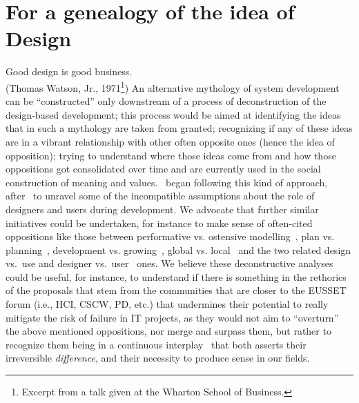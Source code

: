 \documentclass{article}
\let\origquotation\quotation
\let\endorigquotation\endquotation
\renewenvironment{quotation}{\vspace{-0.5\parskip}
  \origquotation
  \footnotesize
}{\endorigquotation}
\begin{document}
\section{For a genealogy of the idea of Design}
\label{sec:nodesign}
\begin{quotation}
Good design is good business.\\
(Thomas Watson, Jr., 1971\footnote{Excerpt from a talk given at the Wharton School of Business.})
\end{quotation}
An alternative mythology of system development can be ``constructed'' only downstream of a process of deconstruction of the design-based development; this process would be aimed at identifying the ideas that in such a mythology are taken from granted; recognizing if any of these ideas are in a vibrant relationship with other often opposite ones (hence the idea of opposition); trying to understand where those ideas come from and how those oppositions got consolidated over time and are currently used in the social construction of meaning and values.~\citet{beath_contradictory_1994} began following this kind of approach, after~\citet{derrida_positions_1981} to unravel some of the incompatible assumptions about the role of designers and users during development. We advocate that further similar initiatives could be undertaken, for instance to make sense of often-cited oppositions like those between performative vs. ostensive modelling~\citep{poltrock_modeling_2009}, plan vs. planning~\citep{suchman_human-machine_2006}, development vs. growing~\citep{truex_growing_1999}, global vs. local~\citep{rolland_balancing_2002} and the two related design vs.~use and designer vs.~user~\citep{bowers_janus_1991} ones. We believe these deconstructive analyses could be useful, for instance, to understand if there is something in the rethorics of the proposals that stem from the communities that are closer to the EUSSET forum (i.e., HCI, CSCW, PD, etc.) that undermines their potential to really mitigate the risk of failure in IT projects, as they would not aim to ``overturn'' the above mentioned oppositions, nor merge and surpass them, but rather to recognize them being in a continuous interplay~\citep{derrida_positions_1981} that both asserts their irreversible \emph{difference}, and their necessity to produce sense in our fields. 
\end{document}
